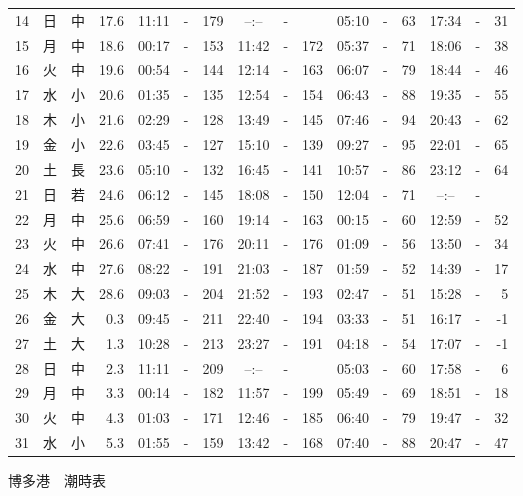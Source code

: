 \documentclass[12pt.a4j]{jsarticle}
\begin{document}
\begin{center}
\begin{table}[ht]
\begin{tabular}{|rc|cr|ccrccr|ccrccr|}
14 & 日 & 中 & 17.6 &  11:11 &-& 179  &  --:-- &-&     &   05:10 &-&  63  &   17:34 &-&  31  \\
15 & 月 & 中 & 18.6 &  00:17 &-& 153  &  11:42 &-& 172  &   05:37 &-&  71  &   18:06 &-&  38  \\
16 & 火 & 中 & 19.6 &  00:54 &-& 144  &  12:14 &-& 163  &   06:07 &-&  79  &   18:44 &-&  46  \\
17 & 水 & 小 & 20.6 &  01:35 &-& 135  &  12:54 &-& 154  &   06:43 &-&  88  &   19:35 &-&  55  \\
18 & 木 & 小 & 21.6 &  02:29 &-& 128  &  13:49 &-& 145  &   07:46 &-&  94  &   20:43 &-&  62  \\
19 & 金 & 小 & 22.6 &  03:45 &-& 127  &  15:10 &-& 139  &   09:27 &-&  95  &   22:01 &-&  65  \\
20 & 土 & 長 & 23.6 &  05:10 &-& 132  &  16:45 &-& 141  &   10:57 &-&  86  &   23:12 &-&  64  \\
21 & 日 & 若 & 24.6 &  06:12 &-& 145  &  18:08 &-& 150  &   12:04 &-&  71  &   --:-- &-&     \\
22 & 月 & 中 & 25.6 &  06:59 &-& 160  &  19:14 &-& 163  &   00:15 &-&  60  &   12:59 &-&  52  \\
23 & 火 & 中 & 26.6 &  07:41 &-& 176  &  20:11 &-& 176  &   01:09 &-&  56  &   13:50 &-&  34  \\
24 & 水 & 中 & 27.6 &  08:22 &-& 191  &  21:03 &-& 187  &   01:59 &-&  52  &   14:39 &-&  17  \\
25 & 木 & 大 & 28.6 &  09:03 &-& 204  &  21:52 &-& 193  &   02:47 &-&  51  &   15:28 &-&   5  \\
26 & 金 & 大 &  0.3 &  09:45 &-& 211  &  22:40 &-& 194  &   03:33 &-&  51  &   16:17 &-&  -1  \\
27 & 土 & 大 &  1.3 &  10:28 &-& 213  &  23:27 &-& 191  &   04:18 &-&  54  &   17:07 &-&  -1  \\
28 & 日 & 中 &  2.3 &  11:11 &-& 209  &  --:-- &-&     &   05:03 &-&  60  &   17:58 &-&   6  \\
29 & 月 & 中 &  3.3 &  00:14 &-& 182  &  11:57 &-& 199  &   05:49 &-&  69  &   18:51 &-&  18  \\
30 & 火 & 中 &  4.3 &  01:03 &-& 171  &  12:46 &-& 185  &   06:40 &-&  79  &   19:47 &-&  32  \\
31 & 水 & 小 &  5.3 &  01:55 &-& 159  &  13:42 &-& 168  &   07:40 &-&  88  &   20:47 &-&  47  \\
   \hline
   \end{tabular}
\end{table}
\newpage
 {\LARGE 博多港　潮時表　　　}

\end{center}
\end{document}
